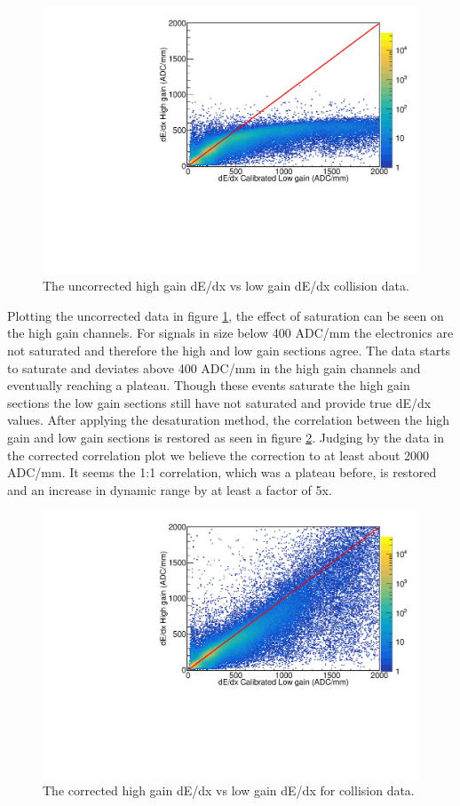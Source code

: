 \documentclass[review]{elsarticle}
\begin{document}
\begin{figure}[H]
\includegraphics[width=\linewidth]{dedxcompare_nodesat}
\caption{The uncorrected high gain dE/dx vs low gain dE/dx collision data.  }
\label{fig:lowvshigh_raw}
\end{figure}
 
Plotting the uncorrected data in figure \ref{fig:lowvshigh_raw}, the effect of saturation can be seen on the high gain channels. For signals in size below 400 ADC/mm the electronics are not saturated and therefore the high and low gain sections agree. The data starts to saturate and deviates above 400 ADC/mm in the high gain channels and eventually reaching a plateau. Though these events saturate the high gain sections the low gain sections still have not saturated and provide true dE/dx values. After applying the desaturation method, the correlation between the high gain and low gain sections is restored as seen in figure \ref{fig:lowvshigh_desat}. Judging by the data in the corrected correlation plot we believe the correction to at least about 2000 ADC/mm. It seems the 1:1 correlation, which was a plateau before, is restored and an increase in dynamic range by at least a factor of 5x.  

\begin{figure}[H]
\includegraphics[width=\linewidth]{dedxcompare_new}
\caption{The corrected high gain dE/dx vs low gain dE/dx for collision data.  }
\label{fig:lowvshigh_desat}
\end{figure}
\end{document}
